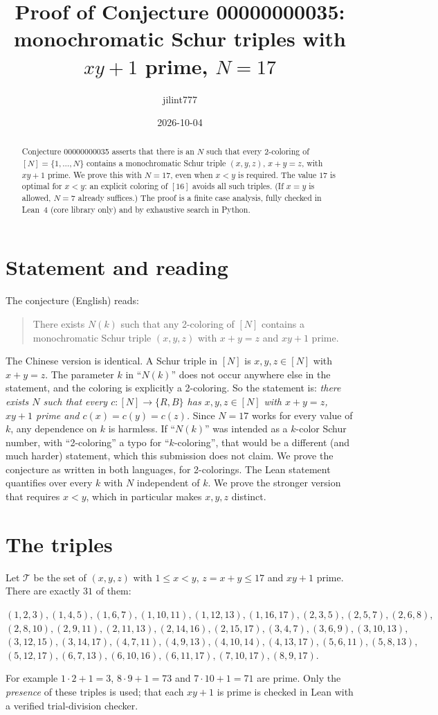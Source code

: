 \documentclass[11pt]{article}
\title{Proof of Conjecture 00000000035:\\
monochromatic Schur triples with $xy+1$ prime, $N=17$}
\author{jilint777}
\date{2026-10-04}
\theoremstyle{remark}
\begin{document}
\sloppy
\maketitle

\begin{abstract}
Conjecture 00000000035 asserts that there is an $N$ such that every
2-coloring of $[N]=\{1,\dots,N\}$ contains a monochromatic Schur triple
$(x,y,z)$, $x+y=z$, with $xy+1$ prime. We prove this with $N=17$, even when
$x<y$ is required. The value $17$ is optimal for $x<y$: an explicit coloring
of $[16]$ avoids all such triples. (If $x=y$ is allowed, $N=7$ already
suffices.) The proof is a finite case analysis, fully checked in Lean~4 (core
library only) and by exhaustive search in Python.
\end{abstract}

\section{Statement and reading}
The conjecture (English) reads:
\begin{quote}
There exists $N(k)$ such that any 2-coloring of $[N]$ contains a monochromatic
Schur triple $(x,y,z)$ with $x+y=z$ and $xy+1$ prime.
\end{quote}
The Chinese version is identical. A Schur triple in $[N]$ is
$x,y,z\in[N]$ with $x+y=z$. The parameter $k$ in ``$N(k)$'' does not occur
anywhere else in the statement, and the coloring is explicitly a
2-coloring. So the statement is: \emph{there exists $N$ such that every
$c:[N]\to\{R,B\}$ has $x,y,z\in[N]$ with $x+y=z$, $xy+1$ prime and
$c(x)=c(y)=c(z)$.} Since $N=17$ works for every value of $k$, any
dependence on $k$ is harmless. If ``$N(k)$'' was intended as a $k$-color Schur
number, with ``2-coloring'' a typo for ``$k$-coloring'', that would be a
different (and much harder) statement, which this submission does not claim.
We prove the conjecture as written in both languages, for 2-colorings. The
Lean statement quantifies over every $k$ with $N$ independent of $k$. We prove the stronger version that requires
$x<y$, which in particular makes $x,y,z$ distinct.

\section{The triples}
Let $\mathcal T$ be the set of $(x,y,z)$ with $1\le x<y$, $z=x+y\le17$ and
$xy+1$ prime. There are exactly $31$ of them:
\begin{center}\small
$(1,2,3),(1,4,5),(1,6,7),(1,10,11),(1,12,13),(1,16,17),(2,3,5),(2,5,7),(2,6,8),$\\
$(2,8,10),(2,9,11),(2,11,13),(2,14,16),(2,15,17),(3,4,7),(3,6,9),(3,10,13),$\\
$(3,12,15),(3,14,17),(4,7,11),(4,9,13),(4,10,14),(4,13,17),(5,6,11),(5,8,13),$\\
$(5,12,17),(6,7,13),(6,10,16),(6,11,17),(7,10,17),(8,9,17)$.
\end{center}
For example $1\cdot2+1=3$, $8\cdot9+1=73$ and $7\cdot10+1=71$ are prime. Only the
\emph{presence} of these triples is used; that each $xy+1$ is prime is checked
in Lean with a verified trial-division checker.
\end{document}
